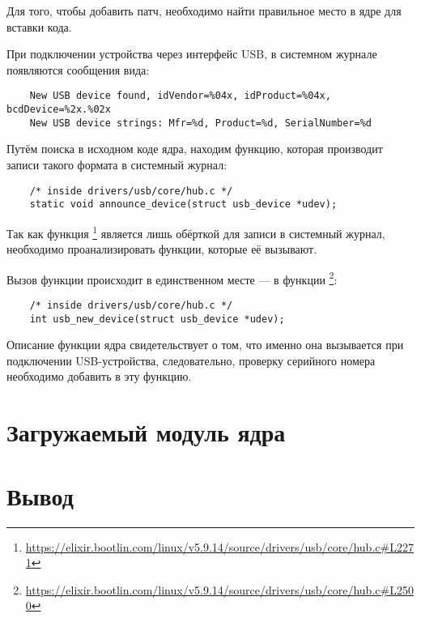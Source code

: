 Для того, чтобы добавить патч, необходимо найти правильное место в ядре для вставки кода.

При подключении устройства через интерфейс USB, в системном журнале появляются сообщения вида:
\verbatimfont{\footnotesize}
\begin{verbatim}
	New USB device found, idVendor=%
	New USB device strings: Mfr=%
\end{verbatim}

Путём поиска в исходном коде ядра, находим функцию, которая производит записи такого формата в системный журнал:
\verbatimfont{\small}
\begin{verbatim}
	/* inside drivers/usb/core/hub.c */
	static void announce_device(struct usb_device *udev);
\end{verbatim}

Так как функция \footnote{\url{https://elixir.bootlin.com/linux/v5.9.14/source/drivers/usb/core/hub.c\#L2271}} является лишь обёрткой для записи в системный журнал, необходимо проанализировать функции, которые её вызывают.

Вызов функции  происходит в единственном месте — в функции \footnote{\url{https://elixir.bootlin.com/linux/v5.9.14/source/drivers/usb/core/hub.c\#L2500}}:
\begin{verbatim}
	/* inside drivers/usb/core/hub.c */
	int usb_new_device(struct usb_device *udev);
\end{verbatim}

Описание функции ядра  свидетельствует о том, что именно она вызывается при подключении USB-устройства, следовательно, проверку серийного номера необходимо добавить в эту функцию.

\section{Загружаемый модуль ядра}

\section{}


\section*{Вывод}
